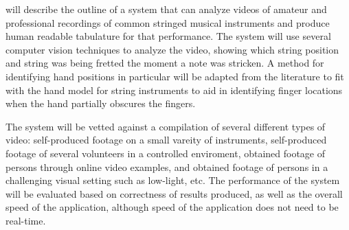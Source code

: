 will describe the outline of a system that can analyze videos
of amateur and professional recordings of common stringed musical instruments and
produce human readable tabulature for that performance.
The system will use several computer vision techniques to analyze the video,
showing which string position and string was being fretted the moment a note was stricken.
A method for identifying hand positions in particular will be adapted from the literature
to fit with the hand model for string instruments to aid in identifying finger locations
when the hand partially obscures the fingers.
\par
The system will be vetted against a compilation of several different types of video:
self-produced footage on a small vareity of instruments,
self-produced footage of several volunteers in a controlled enviroment,
obtained footage of persons through online video examples,
and obtained footage of persons in a challenging visual setting such as low-light, etc.
The performance of the system will be evaluated based on correctness of results produced,
as well as the overall speed of the application,
although speed of the application does not need to be real-time.
